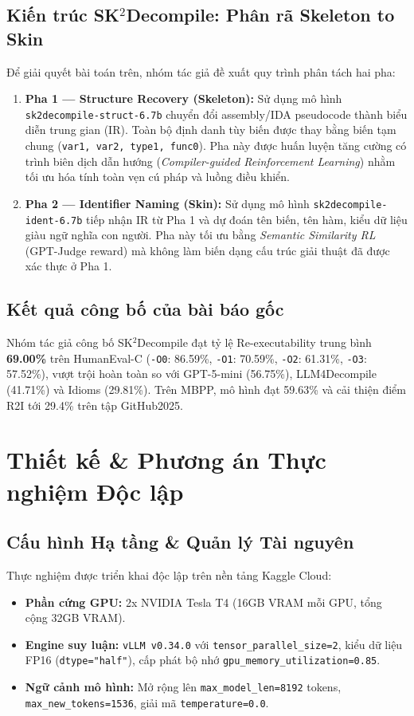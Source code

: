 \documentclass[11pt,a4paper]{article}
\begin{document}
\subsection{Kiến trúc SK$^2$Decompile: Phân rã Skeleton to Skin}
Để giải quyết bài toán trên, nhóm tác giả đề xuất quy trình phân tách hai pha:
\begin{enumerate}
    \item \textbf{Pha 1 — Structure Recovery (Skeleton):} Sử dụng mô hình \texttt{sk2decompile-struct-6.7b} chuyển đổi assembly/IDA pseudocode thành biểu diễn trung gian (IR). Toàn bộ định danh tùy biến được thay bằng biến tạm chung (\texttt{var1, var2, type1, func0}). Pha này được huấn luyện tăng cường có trình biên dịch dẫn hướng (\textit{Compiler-guided Reinforcement Learning}) nhằm tối ưu hóa tính toàn vẹn cú pháp và luồng điều khiển.
    \item \textbf{Pha 2 — Identifier Naming (Skin):} Sử dụng mô hình \texttt{sk2decompile-ident-6.7b} tiếp nhận IR từ Pha 1 và dự đoán tên biến, tên hàm, kiểu dữ liệu giàu ngữ nghĩa con người. Pha này tối ưu bằng \textit{Semantic Similarity RL} (GPT-Judge reward) mà không làm biến dạng cấu trúc giải thuật đã được xác thực ở Pha 1.
\end{enumerate}

\subsection{Kết quả công bố của bài báo gốc}
Nhóm tác giả công bố SK$^2$Decompile đạt tỷ lệ Re-executability trung bình \textbf{69.00\%} trên HumanEval-C (\texttt{-O0}: 86.59\%, \texttt{-O1}: 70.59\%, \texttt{-O2}: 61.31\%, \texttt{-O3}: 57.52\%), vượt trội hoàn toàn so với GPT-5-mini (56.75\%), LLM4Decompile (41.71\%) và Idioms (29.81\%). Trên MBPP, mô hình đạt 59.63\% và cải thiện điểm R2I tới 29.4\% trên tập GitHub2025.

\section{Thiết kế \& Phương án Thực nghiệm Độc lập}

\subsection{Cấu hình Hạ tầng \& Quản lý Tài nguyên}
Thực nghiệm được triển khai độc lập trên nền tảng Kaggle Cloud:
\begin{itemize}
    \item \textbf{Phần cứng GPU:} 2x NVIDIA Tesla T4 (16GB VRAM mỗi GPU, tổng cộng 32GB VRAM).
    \item \textbf{Engine suy luận:} \texttt{vLLM v0.34.0} với \texttt{tensor\_parallel\_size=2}, kiểu dữ liệu FP16 (\texttt{dtype="half"}), cấp phát bộ nhớ \texttt{gpu\_memory\_utilization=0.85}.
    \item \textbf{Ngữ cảnh mô hình:} Mở rộng lên \texttt{max\_model\_len=8192} tokens, \texttt{max\_new\_tokens=1536}, giải mã \texttt{temperature=0.0}.
\end{itemize}
\end{document}
